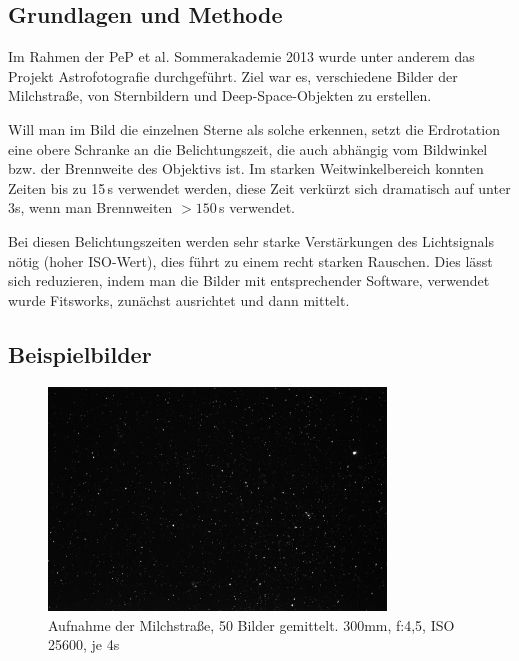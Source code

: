 \subsection{Grundlagen und Methode}
Im Rahmen der PeP et al. Sommerakademie 2013 wurde unter anderem das Projekt Astrofotografie durchgeführt. Ziel war es, verschiedene Bilder der Milchstraße, von Sternbildern und Deep-Space-Objekten zu erstellen.

Will man im Bild die einzelnen Sterne als solche erkennen, setzt die Erdrotation eine obere Schranke an die Belichtungszeit, die auch abhängig vom Bildwinkel bzw. der Brennweite des Objektivs ist. Im starken Weitwinkelbereich konnten Zeiten bis zu 15\,s verwendet werden, diese Zeit verkürzt sich dramatisch auf unter 3s, wenn man Brennweiten $>150$\,s verwendet.

Bei diesen Belichtungszeiten werden sehr starke Verstärkungen des Lichtsignals nötig (hoher ISO-Wert), dies führt zu einem recht starken Rauschen. Dies lässt sich reduzieren, indem man die Bilder mit entsprechender Software, verwendet wurde Fitsworks, zunächst ausrichtet und dann mittelt.

\subsection{Beispielbilder}

\begin{figure}[!h]
\centering
\includegraphics[width=0.8\textwidth]{figs/astro/Haufen.jpg}
\caption{Aufnahme der Milchstraße, 50 Bilder gemittelt. 300mm, f:4,5, ISO 25600,  je 4s}
\end{figure}



